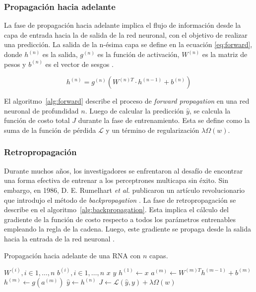 \subsubsection{Propagación hacia adelante}
La fase de propagación hacia adelante implica el flujo de información desde la capa de entrada hacia la de 
salida de la red neuronal, con el objetivo de realizar una predicción. La salida de la n-ésima capa se 
define en la ecuación \ref{eq:forward}, donde $h^{(n)}$ es la salida, $g^{(n)}$ es la función de activación, $W^{(n)}$ 
es la matriz de pesos y $b^{(n)}$ es el vector de sesgos \citep{CITE:35} \citep{CITE:44}.

\begin{equation}
	\label{eq:forward}
	h^{(n)} = g^{(n)} (W^{(n)T} \cdot h^{(n-1)} + b^{(n)})
\end{equation}

El algoritmo~\ref{alg:forward} describe el proceso de \emph{forward propagation} en una red neuronal de profundidad $n$. 
Luego de calcular la predicción $\hat{y}$, se calcula la función de costo total $J$ durante la fase de entrenamiento. 
Esta se define como la suma de la función de pérdida $\mathcal{L}$ y un término de regularización $\lambda \Omega(w)$.

\subsubsection{Retropropagación}

Durante muchos años, los investigadores se enfrentaron al desafío de encontrar una forma 
efectiva de entrenar a los perceptrones multicapa sin éxito. Sin embargo, en 1986, D. E. 
Rumelhart \emph{et al.} publicaron un artículo revolucionario que introdujo el método 
de \emph{backpropagation} \citep{CITE:47}. La fase de retropropagación se describe en el 
algoritmo~\ref{alg:backpropagation}. Esta implica el cálculo del gradiente de la función de 
costo respecto a todos los parámetros entrenables empleando la regla de la cadena. 
Luego, este gradiente se propaga desde la salida hacia la entrada de la red neuronal \citep{CITE:35} \citep{CITE:42} \citep{CITE:44}.

\begin{algorithm}
	\caption{Propagación hacia adelante de una RNA con $n$ capas.}
	\label{alg:forward}
	\begin{algorithmic}
		\Require $W^{(i)}, i \in 1, \ldots, n$ 
		\Require $b^{(i)}, i \in 1, \ldots, n$ 
		\Require $x$ 
		\Require $y$ 
		\State $h^{(1)} \gets x$
		\State $a^{(m)} \gets W^{(m)T}h^{(m-1)} + b^{(m)} $
		\State $h^{(m)} \gets g(a^{(m)})$
		\EndFor
		\State $\hat{y} \gets h^{(n)}$
		\State $J \gets \mathcal{L}(\hat{y}, y) + \lambda \Omega(w)$ 
	\end{algorithmic}
\end{algorithm}


